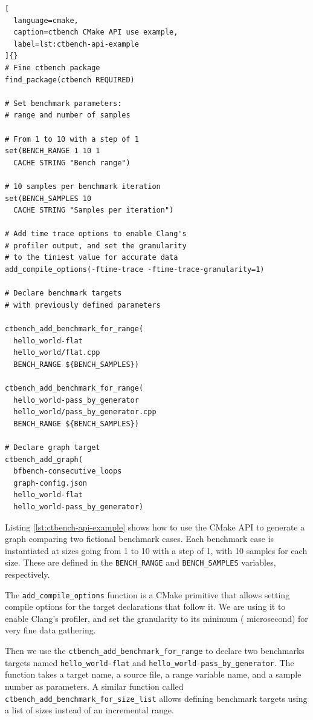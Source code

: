 \documentclass[../../main.tex]{subfiles}
\begin{document}
\begin{lstlisting}[
  language=cmake,
  caption=ctbench CMake API use example,
  label=lst:ctbench-api-example
]{}
# Fine ctbench package
find_package(ctbench REQUIRED)

# Set benchmark parameters:
# range and number of samples

# From 1 to 10 with a step of 1
set(BENCH_RANGE 1 10 1
  CACHE STRING "Bench range")

# 10 samples per benchmark iteration
set(BENCH_SAMPLES 10
  CACHE STRING "Samples per iteration")

# Add time trace options to enable Clang's
# profiler output, and set the granularity
# to the tiniest value for accurate data
add_compile_options(-ftime-trace -ftime-trace-granularity=1)

# Declare benchmark targets
# with previously defined parameters

ctbench_add_benchmark_for_range(
  hello_world-flat
  hello_world/flat.cpp
  BENCH_RANGE ${BENCH_SAMPLES})

ctbench_add_benchmark_for_range(
  hello_world-pass_by_generator
  hello_world/pass_by_generator.cpp
  BENCH_RANGE ${BENCH_SAMPLES})

# Declare graph target
ctbench_add_graph(
  bfbench-consecutive_loops
  graph-config.json
  hello_world-flat
  hello_world-pass_by_generator)
\end{lstlisting}

Listing \ref{lst:ctbench-api-example} shows how to use the CMake API to generate
a graph comparing two fictional benchmark cases. Each benchmark case is
instantiated at sizes going from 1 to 10 with a step of 1, with 10 samples for
each size. These are defined in the \lstinline{BENCH_RANGE} and
\lstinline{BENCH_SAMPLES} variables, respectively.

The \lstinline{add_compile_options} function is a CMake primitive that allows
setting compile options for the target declarations that follow it. We are using
it to enable Clang's profiler, and set the granularity to its minimum (
microsecond) for very fine data gathering.

Then we use the \lstinline{ctbench_add_benchmark_for_range} to declare two
benchmarks targets named \lstinline{hello_world-flat} and
\lstinline{hello_world-pass_by_generator}. The function takes a target name, a
\cpp source file, a range variable name, and a sample number as parameters.
A similar function called \lstinline{ctbench_add_benchmark_for_size_list} allows
defining benchmark targets using a list of sizes instead of an incremental
range.
\end{document}
